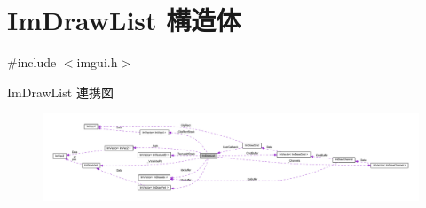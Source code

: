 \hypertarget{struct_im_draw_list}{}\section{Im\+Draw\+List 構造体}
\label{struct_im_draw_list}


{\ttfamily \#include $<$imgui.\+h$>$}



Im\+Draw\+List 連携図\nopagebreak
\begin{figure}[H]
\begin{center}
\leavevmode
\includegraphics[width=350pt]{struct_im_draw_list__coll__graph}
\end{center}
\end{figure}
